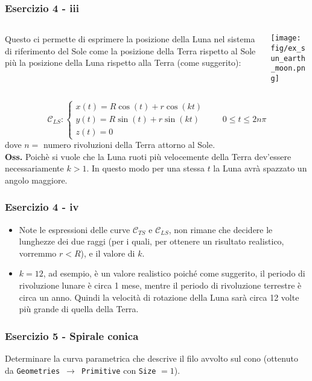 \documentclass{beamer}
\newcommand{\fig}{figures} %
\begin{document}
\begin{frame}
\frametitle{Esercizio 4 - iii}

\begin{columns}
\begin{column}{0.5\textwidth}
Questo ci permette di esprimere la posizione della Luna nel sistema di riferimento del Sole come la posizione della Terra rispetto al Sole  pi\`u la posizione della Luna rispetto alla Terra (come suggerito):
\end{column}
\begin{column}{0.5\textwidth}
\texttt{[image: \\fig/ex\_sun\_earth\_moon.png]}
\end{column}
\end{columns}
\vspace{0.4cm}
\begin{displaymath}
\mathcal{C}_{LS}:\begin{cases}
 x(t)=  R \cos(t) + r \cos(kt)\\
 y(t)=  R \sin(t) + r \sin(kt)\\
 z(t)= 0
\end{cases}
\qquad 0 \leq t \leq 2 n \pi
\end{displaymath}
dove $n =$ numero rivoluzioni della Terra attorno al Sole. \\
\vspace{0.2cm}
\textbf{Oss.} Poich\`e si vuole che la Luna ruoti pi\`u velocemente della Terra dev'essere necessariamente $k > 1$. In questo modo per una stessa $t$ la Luna avr\`a spazzato un angolo maggiore.
\end{frame}


\begin{frame}
	\frametitle{Esercizio 4 - iv} 
	\begin{itemize}
	\item Note le espressioni delle curve $\mathcal{C}_{TS}$ e $\mathcal{C}_{LS}$, non rimane che
	decidere le lunghezze dei due raggi (per i quali, per ottenere un risultato
	realistico, vorremmo $r<R$), e il valore di $k$.  
	\item $k = 12$, ad esempio, \`e un valore realistico poich\'e come suggerito, il periodo di rivoluzione lunare \`e circa 1 mese, mentre il periodo di rivoluzione terrestre \`e circa un anno. Quindi la velocit\`a di rotazione della Luna sar\`a circa 12 volte pi\`u grande di quella della Terra.
	\end{itemize}
\end{frame}


\begin{frame}
	\frametitle{Esercizio 5 - Spirale conica}
	
	\begin{center}
	\end{center}
	Determinare la curva parametrica che descrive il filo avvolto sul cono (ottenuto da \texttt{Geometries $\rightarrow$ Primitive} con \texttt{Size} $=1$). 
\end{frame}
\end{document}
